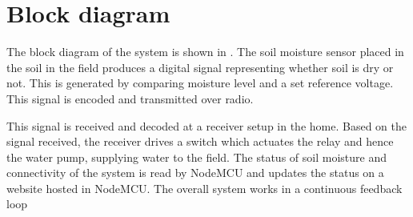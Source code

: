 \section{Block diagram}
The block diagram of the system is shown in . The soil moisture sensor placed in the soil in the field produces a digital signal representing whether soil is dry or not. This is generated by comparing moisture level and a set reference voltage. This signal is encoded and transmitted over radio.


This signal is received and decoded at a receiver setup in the home. Based on the signal received, the receiver drives a switch which actuates the relay and hence the water pump, supplying water to the field. The status of soil moisture and connectivity of the system is read by NodeMCU and updates the status on a website hosted in NodeMCU. The overall system works in a continuous feedback loop